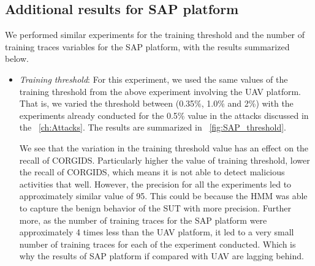 \subsection{Additional results for SAP platform}
We performed similar experiments for the training threshold and the number of training traces variables for the SAP platform, with the results summarized below.

\begin{itemize}
\item \textit{Training threshold}: For this experiment, we used the same values of the training threshold from the above experiment involving the UAV platform. That is, we varied the threshold between (0.35\%, 1.0\% and 2\%) with the experiments already conducted for the 0.5\% value in the attacks discussed in the ~\autoref{ch:Attacks}. The results are summarized in ~\autoref{fig:SAP_threshold}.

We see that the variation in the training threshold value has an effect on the recall of CORGIDS. Particularly higher the value of training threshold, lower the recall of CORGIDS, which means it is not able to detect malicious activities that well. However, the precision for all the experiments led to approximately similar value of 95. This could be because the HMM was able to capture the benign behavior of the SUT with more precision. Further more, as the number of training traces for the SAP platform were approximately 4 times less than the UAV platform, it led to a very small number of training traces for each of the experiment conducted. Which is why the results of SAP platform if compared with UAV are lagging behind.

\end{itemize}
